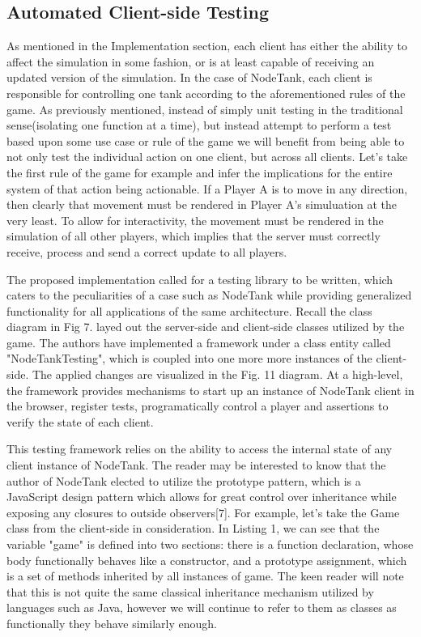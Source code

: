 \documentclass[conference]{IEEEtran}
\begin{document}
\subsection{Automated Client-side Testing}

As mentioned in the Implementation section, each client has either the ability to affect the simulation in some fashion, or is at least capable of receiving an updated
version of the simulation. In the case of NodeTank, each client is responsible for controlling one tank according to the aforementioned rules of the game. As previously mentioned,
instead of simply unit testing in the traditional sense(isolating one function at a time), but instead attempt to perform a test based upon some use case or rule of the game we will
 benefit from being able to not only test the individual action on one client, but across all clients. Let's take the first rule of the game for example and infer the implications for the entire system 
 of that action being actionable. If a Player A is to move in any direction, then clearly that movement must be rendered in Player A's simuluation at the very least. To allow for interactivity, 
 the movement must be rendered in the simulation of all other players, which implies that the server must correctly receive, process and send a correct update to all players. 
 
 The proposed implementation called for a testing library to be written, which caters to the peculiarities of a case such as NodeTank while providing generalized functionality for all 
 applications of the same architecture. Recall the class diagram in Fig 7. layed out the server-side and client-side classes utilized by the game. The authors have implemented a framework
 under a class entity called "NodeTankTesting", which is coupled into one more more instances of the client-side. The applied changes are visualized in the Fig. 11 diagram. At a high-level,
 the framework provides mechanisms to start up an instance of NodeTank client in the browser, register tests, programatically control a player and assertions to verify the state of each client. 

This testing framework relies on the ability to access the internal state of any client instance of NodeTank. The reader may be interested to know that the author of NodeTank 
elected to utilize the prototype pattern, which is a JavaScript design pattern which allows for great control over inheritance while exposing any closures to outside observers[7]. For example, 
let's take the Game class from the client-side in consideration. In Listing 1, we can see that the variable "game" is defined into two sections: there is a function declaration, whose body functionally 
behaves like a constructor, and a prototype assignment, which is a set of methods inherited by all instances of game. The keen reader will note that this is not quite the same classical inheritance
mechanism utilized by languages such as Java, however we will continue to refer to them as classes as functionally they behave similarly enough.
\end{document}
